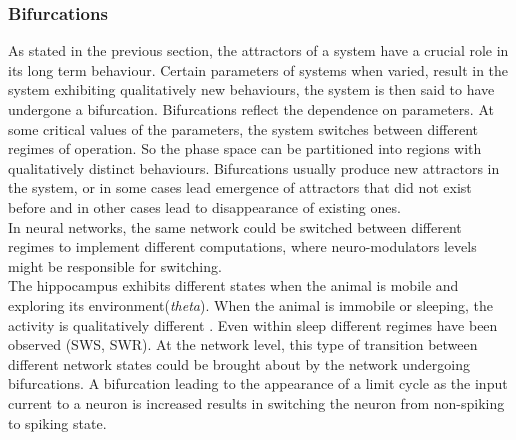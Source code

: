 \subsubsection{Bifurcations}
As stated in the previous section, the attractors of a system have a crucial role in its long term behaviour. Certain parameters of systems when varied, result in the system exhibiting qualitatively new behaviours, the system is then said to have undergone a bifurcation. Bifurcations reflect the dependence on parameters. At some critical values of the parameters, the system switches between different regimes of operation. So the phase space can be partitioned into regions with qualitatively distinct behaviours. Bifurcations usually produce new attractors in the system, or in some cases lead emergence of attractors that did not exist before and in other cases lead to disappearance of existing ones. \\
In neural networks, the same network could be switched between different regimes to implement different computations, where neuro-modulators levels might be responsible for switching.\\
The hippocampus exhibits different states when the animal is mobile and exploring its environment(\emph{theta}). When the animal is immobile or sleeping, the activity is qualitatively different \cite{Buzsaki2011,  Montgomery2008}. Even within sleep different regimes have been observed (SWS, SWR). 
At the network level, this type of transition between different network states could be brought about by the network undergoing bifurcations. A bifurcation leading to the appearance of a limit cycle as the input current to a neuron is increased results in switching the neuron from non-spiking to spiking state. %

